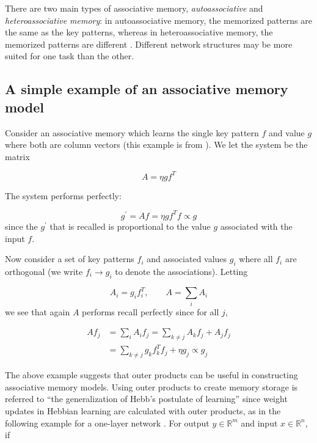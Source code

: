 There are two main types of associative memory, \emph{autoassociative} and \emph{heteroassociative memory}: in autoassociative memory, the memorized patterns are the same as the key patterns, whereas in heteroassociative memory, the memorized patterns are different \cite[p. 38]{Haykin:2009:NNC:1213811}. Different network structures may be more suited for one task than the other.

\subsection{A simple example of an associative memory model}

Consider an associative memory which learns the single key pattern $f$ and value $g$ where both are column vectors (this example is from \cite[p. 163-165]{Anderson95}). We let the system be the matrix

\begin{equation*}
A = \eta g f^T
\end{equation*}

The system performs perfectly:

\begin{equation*}
g^\prime = Af = \eta g f^T f \propto g
\end{equation*}
%
since the $g^\prime$ that is recalled is proportional to the value $g$ associated with the input $f$.

Now consider a set of key patterns $f_i$ and associated values $g_i$ where all $f_i$ are orthogonal (we write $f_i \rightarrow g_i$ to denote the associations). Letting

\begin{equation*}
A_i = g_i f_i^T, \qquad A = \sum_{i} A_i
\end{equation*}
%
we see that again $A$ performs recall perfectly since for all $j$,

\begin{align*}
  A f_j & = \sum_{i}A_i f_j = \sum_{k \neq j} A_k f_j + A_j f_j \\
  & = \sum_{k \neq j} g_k f_k^T f_j + \eta g_j \propto g_j
\end{align*}

The above example suggests that outer products can be useful in constructing associative memory models. Using outer products to create memory storage is referred to ``the generalization of Hebb's postulate of learning'' \cite[p. 698]{Haykin:2009:NNC:1213811} since weight updates in Hebbian learning are calculated with outer products, as in the following example for a one-layer network \cite[p. 39-40]{fyfe2000}. For output $y \in \mathbb{R}^m$ and input $x \in \mathbb{R}^n$, if

